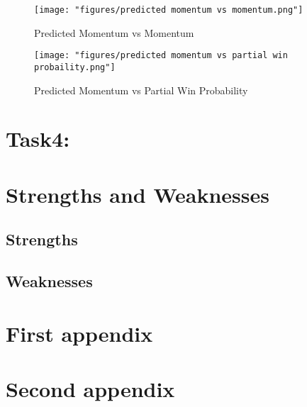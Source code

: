 \documentclass{mcmthesis}
\begin{document}
\begin{figure}[htbp]
\centering
\texttt{[image: "figures/predicted momentum vs momentum.png"]}
\caption{Predicted Momentum vs Momentum}
\label{fig:pvm}
\end{figure}

\begin{figure}[htbp]
\centering
\texttt{[image: "figures/predicted momentum vs partial win probaility.png"]}
\caption{Predicted Momentum vs Partial Win Probability}
\label{fig:pmvpp}
\end{figure}

\section{Task4: }

\section{Strengths and Weaknesses}

\subsection{Strengths}

\subsection{Weaknesses}

\begin{thebibliography}{99}
\end{thebibliography}

\begin{appendices}

\section{First appendix}

\section{Second appendix}

\end{appendices}
\end{document}
